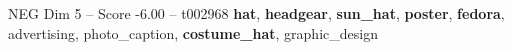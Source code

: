 \begin{textsample}{NEG Dim 5 – Score -6.00 – t002968}  \label{ex:f5_neg_020}
\textbf{hat}, \textbf{headgear}, \textbf{sun\_hat}, \textbf{poster}, \textbf{fedora}, advertising, photo\_caption, \textbf{costume\_hat}, graphic\_design

\end{textsample}
